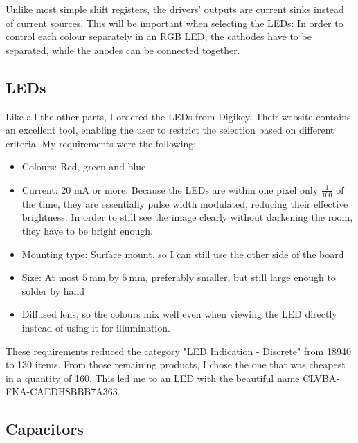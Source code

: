 \documentclass[a4paper, 11pt, titlepage]{report}
\begin{document}
Unlike most simple shift registers, the drivers' outputs are current sinks instead of current
sources. This will be important when selecting the LEDs: In order to control each colour separately
in an RGB LED, the cathodes have to be separated, while the anodes can be connected together.



\subsection{LEDs}

Like all the other parts, I ordered the LEDs from Digikey. Their website contains an excellent
tool, enabling the user to restrict the selection based on different criteria. My requirements
were the following:

\begin{itemize}

\item Colours: Red, green and blue

\item Current: 20 mA or more. Because the LEDs are within one pixel only $\frac{1}{100}$ of the
time, they are essentially pulse width modulated, reducing their effective brightness. In order to
still see the image clearly without darkening the room, they have to be bright enough.

\item Mounting type: Surface mount, so I can still use the other side of the board

\item Size: At most $\SI{5}{\milli\meter}$ by $\SI{5}{\milli\meter}$, preferably smaller, but
still large enough to solder by hand

\item Diffused lens, so the colours mix well even when viewing the LED directly instead of using
it for illumination.

\end{itemize}

These requirements reduced the category "LED Indication - Discrete" from 18940 to 130 items.
From those remaining products, I chose the one that was cheapest in a quantity of 160. This
led me to an LED with the beautiful name CLVBA-FKA-CAEDH8BBB7A363.



\subsection{Capacitors}
\end{document}
